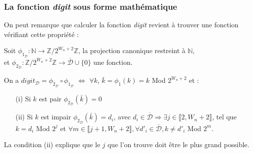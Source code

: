 \documentclass[12pt, a4paper]{memoir}
\begin{document}
\subsubsection{La fonction \emph{digit} sous forme mathématique}

On peut remarque que calculer la fonction \emph{digit} revient à trouver une fonction vérifiant cette propriété :

\begin{Propriété}
 Soit $\phi_{1_\mathcal{D}} : \mathbb{N} \rightarrow \mathbb{Z} / 2^{W_n+2} \mathbb{Z}$, la projection canonique restreint à $\mathbb{N}$, \\ 
 et $\phi_{2_\mathcal{D}} : \mathbb{Z} / 2^{W_n+2} \mathbb{Z} \rightarrow \overline{\mathcal{D}} \cup \{0\}$ une fonction.
 
 On a $digit_{\mathcal{D}} = \phi_{2_\mathcal{D}} \circ \phi_{1_\mathcal{D}}$ $\iff$
 $\forall k$, $\bar{k} = \phi_1(k) = k$ Mod $2^{W_n+2}$ et : \\
 \begin{itemize}
  \item [(i)] Si $k$ est pair $\phi_{2_\mathcal{D}}(\bar{k}) = 0$
  \item [(ii)] Si $k$ est impair $\phi_{2_\mathcal{D}}(\bar{k}) = d_i$, avec $d_i \in \overline{\mathcal{D}} 
  \Rightarrow \exists j \in \llbracket 2,W_n+2 \rrbracket$,
 tel que $k = d_i$ Mod $2^j$ et $\forall m \in \llbracket j+1,W_n+2 \rrbracket, \forall d'_i \in \overline{\mathcal{D}}, k \neq d'_i$ Mod $2^m$.
 \end{itemize}
\end{Propriété}

\begin{Remarque}
 La condition (ii) explique que le $j$ que l'on trouve doit être le plus grand possible. 
\end{Remarque}
\end{document}
